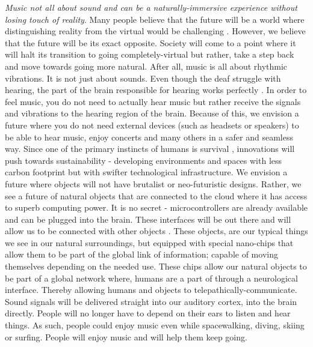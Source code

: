 \documentclass[sigchi]{acmart}
\begin{document}
\textit{Music not all about sound and can be a naturally-immersive experience without losing touch of reality}. Many people believe that the future will be a world where distinguishing reality from the virtual would be challenging \cite{tamura2001mixed}. However, we believe that the future will be its exact opposite. Society will come to a point where it will halt its transition to going completely-virtual but rather, take a step back and move towards going more natural. After all, music is all about rhythmic vibrations. It is not just about sounds. Even though the deaf struggle with hearing, the part of the brain responsible for hearing works perfectly \cite{abcsciencemusic}. In order to feel music, you do not need to actually hear music but rather receive the signals and vibrations to the hearing region of the brain. Because of this, we envision a future where you do not need external devices (such as headsets or speakers) to be able to hear music, enjoy concerts and many others in a safer and seamless way. Since one of the primary instincts of humans is survival \cite{khantzian1983self}, innovations will push towards sustainability - developing environments and spaces with less carbon footprint but with swifter technological infrastructure. We envision a future where objects will not have brutalist or neo-futuristic designs. Rather, we see a future of natural objects that are connected to the cloud where it has access to superb computing power. It is no secret - microcontrollers are already available and can be plugged into the brain. These interfaces will be out there and will allow us to be connected with other objects \cite{musk2019integrated}. These objects, are our typical things we see in our natural surroundings, but equipped with special nano-chips that allow them to be part of the global link of information; capable of moving themselves depending on the needed use. These chips allow our natural objects to be part of a global network where, humans are a part of through a neurological interface. Thereby allowing humans and objects to telepathically-communicate. Sound signals will be delivered straight into our auditory cortex, into the brain directly. People will no longer have to depend on their ears to listen and hear things. As such, people could enjoy music even while spacewalking, diving, skiing or surfing. People will enjoy music and will help them keep going. 
\end{document}
